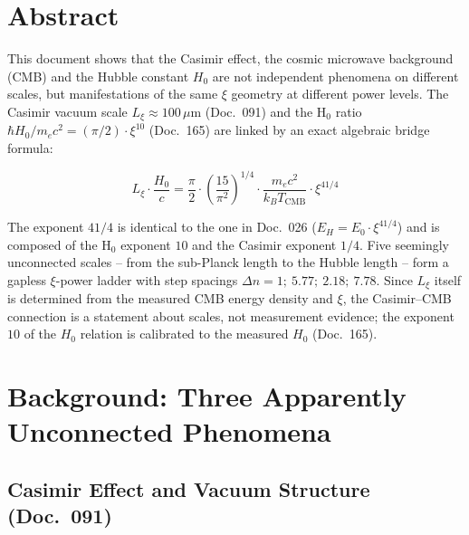 
\section*{Abstract}

This document shows that the Casimir effect, the cosmic microwave background (CMB)
and the Hubble constant $H_0$ are not independent phenomena on different scales,
but manifestations of the same $\xi$ geometry at different power levels.
The Casimir vacuum scale $L_\xi \approx 100\,\mu\text{m}$ (Doc.~091) and the
H$_0$ ratio $\hbar H_0 / m_e c^2 = (\pi/2)\cdot\xi^{10}$ (Doc.~165)
are linked by an exact algebraic bridge formula:

\begin{equation}
    \boxed{L_\xi \cdot \frac{H_0}{c}
    = \frac{\pi}{2}\cdot\left(\frac{15}{\pi^2}\right)^{\!1/4}
    \cdot \frac{m_e c^2}{k_B T_\text{CMB}} \cdot \xi^{41/4}}
    \label{eq:bridge_main}
\end{equation}

The exponent $41/4$ is identical to the one in Doc.~026 ($E_H = E_0 \cdot \xi^{41/4}$)
and is composed of the H$_0$ exponent $10$ and the Casimir exponent $1/4$.
Five seemingly unconnected scales -- from the sub-Planck length to the Hubble length --
form a gapless $\xi$-power ladder with step spacings $\Delta n = 1;\ 5.77;\ 2.18;\ 7.78$.
Since $L_\xi$ itself is determined from the measured CMB energy density and $\xi$, the
Casimir--CMB connection is a statement about scales, not measurement evidence; the
exponent $10$ of the $H_0$ relation is calibrated to the measured $H_0$ (Doc.~165).

\clearpage

\section{Background: Three Apparently Unconnected Phenomena}
\label{sec:background}

\subsection{Casimir Effect and Vacuum Structure (Doc.~091)}

